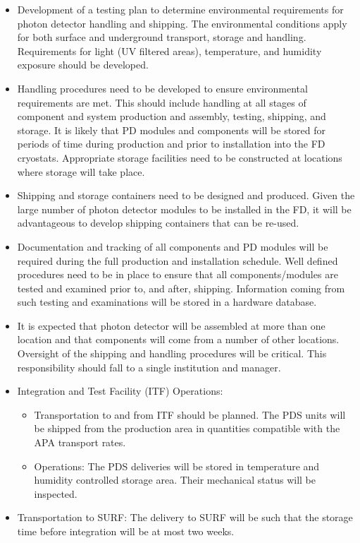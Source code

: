 \begin{itemize}

\item Development of a testing plan to determine environmental requirements for photon detector handling and shipping. The environmental conditions apply for both surface and underground transport, storage and handling. Requirements for light (UV filtered areas), temperature, and humidity exposure should be developed.

\item Handling procedures need to be developed to ensure environmental requirements are met. This should include handling at all stages of component and system production and assembly, testing, shipping, and storage. It is likely that PD modules and components will be stored for periods of time during production and prior to installation into the FD cryostats. Appropriate storage facilities need to be constructed at locations where storage will take place.
\item Shipping and storage containers need to be designed and produced. Given the large number of photon detector modules to be installed in the FD, it will be advantageous to develop shipping containers that can be re-used.

\item Documentation and tracking of all components and PD modules will be required during the full production and installation schedule. Well defined procedures need to be in place to ensure that all components/modules are tested and examined prior to, and after, shipping. Information coming from such testing and examinations will be stored in a hardware database.

\item It is expected that photon detector will be assembled at more than one location and that components will come from a number of other locations. Oversight of the shipping and handling procedures will be critical. This responsibility should fall to a single institution and manager.

\item Integration and Test Facility (ITF) Operations:

	\begin{itemize}
    
	\item Transportation to and from ITF should be planned. The PDS units will be shipped from the production area in quantities compatible with the APA transport rates.
    
    \item Operations: The PDS deliveries will be stored in temperature and humidity controlled storage area. Their mechanical status will be inspected.

	\end{itemize}

\item Transportation to SURF: The delivery to SURF will be such that the storage time before integration will be at most two weeks.

\end{itemize}

